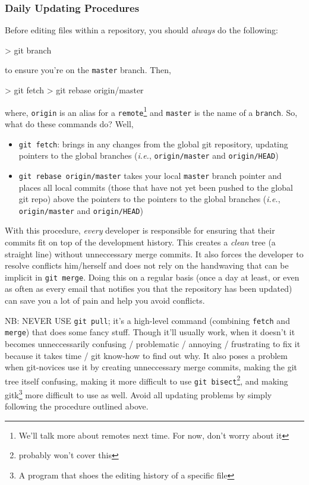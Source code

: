 \documentclass[10pt,letterpaper]{article}
\begin{document}
\subsubsection{Daily Updating Procedures}

Before editing files within a repository, you should \textit{always} do the following:

\begin{code}
> git branch
\end{code}
\noindent to ensure you're on the \texttt{master} branch. Then,
\begin{code}
> git fetch
> git rebase origin/master
\end{code}
\noindent where, \texttt{origin} is an alias for a \texttt{remote}\footnote{We'll talk more about remotes next time. For now, don't worry about it} and \texttt{master} is the name of a \texttt{branch}. So, what do these commands do? Well,
\begin{itemize}
\item \texttt{git fetch}: brings in any changes from the global git repository, updating pointers to the global branches (\textit{i.e.}, \texttt{origin/master} and \texttt{origin/HEAD})
\item \texttt{git rebase origin/master} takes your local \texttt{master} branch pointer and places all local commits (those that have not yet been pushed to the global git repo) above the pointers to the pointers to the global branches (\textit{i.e.}, \texttt{origin/master} and \texttt{origin/HEAD})
\end{itemize}
With this procedure, \textit{every} developer is responsible for ensuring that their commits fit on top of the development history. This creates a \textit{clean} tree (a straight line) without unneccessary merge commits. It also forces the developer to resolve conflicts him/herself and does not rely on the handwaving that can be implicit in \texttt{git merge}. Doing this on a regular basis (once a day at least, or even as often as every email that notifies you that the repository has been updated) can save you a lot of pain and help you avoid conflicts.

NB: NEVER USE \texttt{git pull}; it's a high-level command (combining \texttt{fetch} and \texttt{merge}) that does some fancy stuff. Though it'll usually work, when it doesn't it becomes unneccessarily confusing / problematic / annoying / frustrating to fix it because it takes time / git know-how to find out why. It also poses a problem when git-novices use it by creating unneccessary merge commits, making the git tree itself confusing, making it more difficult to use \texttt{git bisect}\footnote{probably won't cover this}, and making gitk\footnote{A program that shoes the editing history of a specific file} more difficult to use as well. Avoid all updating problems by simply following the procedure outlined above.\smiley
\end{document}
